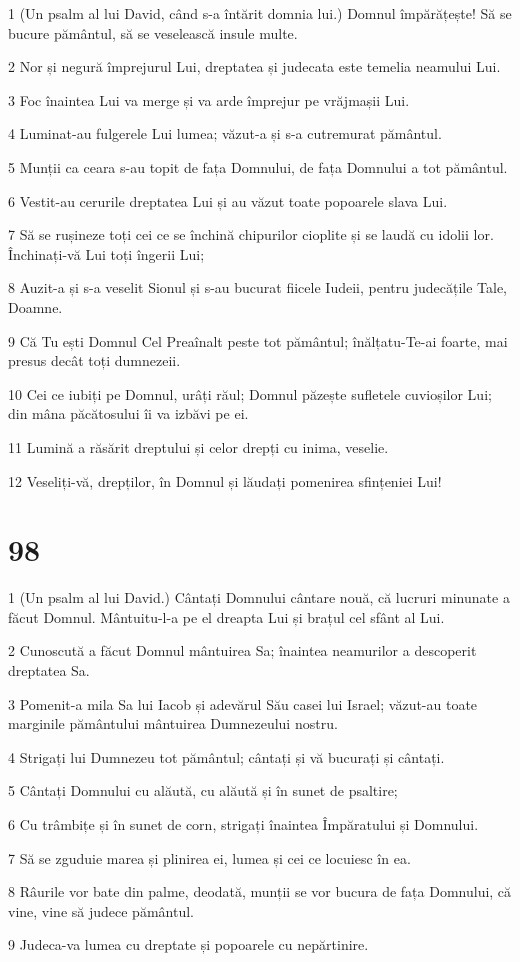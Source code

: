 \par 1 (Un psalm al lui David, când s-a întărit domnia lui.) Domnul împărățește! Să se bucure pământul, să se veselească insule multe.
\par 2 Nor și negură împrejurul Lui, dreptatea și judecata este temelia neamului Lui.
\par 3 Foc înaintea Lui va merge și va arde împrejur pe vrăjmașii Lui.
\par 4 Luminat-au fulgerele Lui lumea; văzut-a și s-a cutremurat pământul.
\par 5 Munții ca ceara s-au topit de fața Domnului, de fața Domnului a tot pământul.
\par 6 Vestit-au cerurile dreptatea Lui și au văzut toate popoarele slava Lui.
\par 7 Să se rușineze toți cei ce se închină chipurilor cioplite și se laudă cu idolii lor. Închinați-vă Lui toți îngerii Lui;
\par 8 Auzit-a și s-a veselit Sionul și s-au bucurat fiicele Iudeii, pentru judecățile Tale, Doamne.
\par 9 Că Tu ești Domnul Cel Preaînalt peste tot pământul; înălțatu-Te-ai foarte, mai presus decât toți dumnezeii.
\par 10 Cei ce iubiți pe Domnul, urâți răul; Domnul păzește sufletele cuvioșilor Lui; din mâna păcătosului îi va izbăvi pe ei.
\par 11 Lumină a răsărit dreptului și celor drepți cu inima, veselie.
\par 12 Veseliți-vă, drepților, în Domnul și lăudați pomenirea sfințeniei Lui!

\chapter{98}

\par 1 (Un psalm al lui David.) Cântați Domnului cântare nouă, că lucruri minunate a făcut Domnul. Mântuitu-l-a pe el dreapta Lui și brațul cel sfânt al Lui.
\par 2 Cunoscută a făcut Domnul mântuirea Sa; înaintea neamurilor a descoperit dreptatea Sa.
\par 3 Pomenit-a mila Sa lui Iacob și adevărul Său casei lui Israel; văzut-au toate marginile pământului mântuirea Dumnezeului nostru.
\par 4 Strigați lui Dumnezeu tot pământul; cântați și vă bucurați și cântați.
\par 5 Cântați Domnului cu alăută, cu alăută și în sunet de psaltire;
\par 6 Cu trâmbițe și în sunet de corn, strigați înaintea Împăratului și Domnului.
\par 7 Să se zguduie marea și plinirea ei, lumea și cei ce locuiesc în ea.
\par 8 Râurile vor bate din palme, deodată, munții se vor bucura de fața Domnului, că vine, vine să judece pământul.
\par 9 Judeca-va lumea cu dreptate și popoarele cu nepărtinire.

